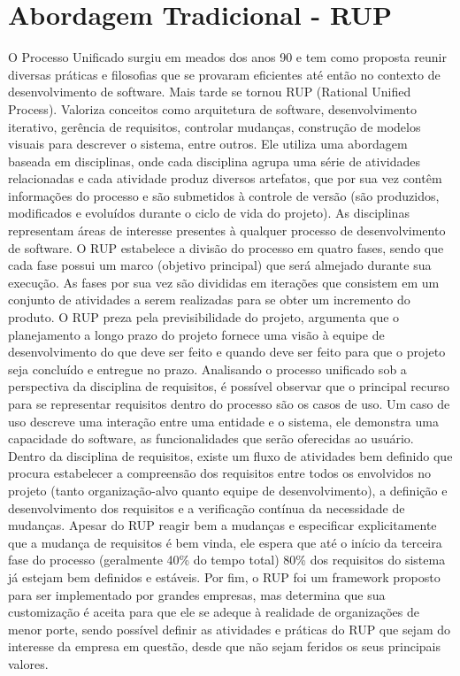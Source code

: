 \section{Abordagem Tradicional - RUP}
O Processo Unificado surgiu em meados dos anos 90 e tem como proposta reunir diversas práticas e filosofias que se provaram eficientes até então no contexto de desenvolvimento de software. Mais tarde se tornou RUP (Rational Unified Process). Valoriza conceitos como arquitetura de software, desenvolvimento iterativo, gerência de requisitos, controlar mudanças, construção de modelos visuais para descrever o sistema, entre outros. Ele utiliza uma abordagem baseada em disciplinas, onde cada disciplina agrupa uma série de atividades relacionadas e cada atividade produz diversos artefatos, que por sua vez contêm informações do processo e são submetidos à controle de versão (são produzidos, modificados e evoluídos durante o ciclo de vida do projeto). As disciplinas representam áreas de interesse presentes à qualquer processo de desenvolvimento de software. O RUP estabelece a divisão do processo em quatro fases, sendo que cada fase possui um marco (objetivo principal) que será almejado durante sua execução. As fases por sua vez são divididas em iterações que consistem em um conjunto de atividades a serem realizadas para se obter um incremento do produto. O RUP preza pela previsibilidade do projeto, argumenta que o planejamento a longo prazo do projeto fornece uma visão à equipe de desenvolvimento do que deve ser feito e quando deve ser feito para que o projeto seja concluído e entregue no prazo. Analisando o processo unificado sob a perspectiva da disciplina de requisitos, é possível observar que o principal recurso para se representar requisitos dentro do processo são os casos de uso. Um caso de uso descreve uma interação entre uma entidade e o sistema, ele demonstra uma capacidade do software, as funcionalidades que serão oferecidas ao usuário. Dentro da disciplina de requisitos, existe um fluxo de atividades bem definido que procura estabelecer a compreensão dos requisitos entre todos os envolvidos no projeto (tanto organização-alvo quanto equipe de desenvolvimento), a definição e desenvolvimento dos requisitos e a verificação contínua da necessidade de mudanças. Apesar do RUP reagir bem a mudanças e especificar explicitamente que a mudança de requisitos é bem vinda, ele espera que até o início da terceira fase do processo (geralmente 40\% do tempo total) 80\% dos requisitos do sistema já estejam bem definidos e estáveis.
Por fim, o RUP foi um framework proposto para ser implementado por grandes empresas, mas determina que sua customização é aceita para que ele se adeque à realidade de organizações  de menor porte, sendo possível definir as atividades e práticas do RUP que sejam do interesse da empresa em questão, desde que não sejam feridos os seus principais valores.

